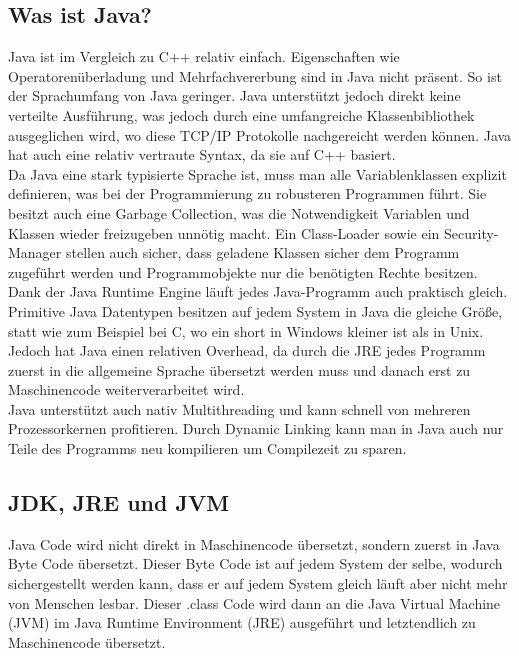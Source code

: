 \documentclass{article}
\begin{document}
	\subsection{Was ist Java?}
	Java ist im Vergleich zu C++ relativ einfach. Eigenschaften wie Operatorenüberladung und Mehrfachvererbung sind in Java nicht präsent. So ist der Sprachumfang von Java geringer. Java unterstützt jedoch direkt keine verteilte Ausführung, was jedoch durch eine umfangreiche Klassenbibliothek ausgeglichen wird, wo diese TCP/IP Protokolle nachgereicht werden können. Java hat auch eine relativ vertraute Syntax, da sie auf C++ basiert. \\
	Da Java eine stark typisierte Sprache ist, muss man alle Variablenklassen explizit definieren, was bei der Programmierung zu robusteren Programmen führt. Sie besitzt auch eine Garbage Collection, was die Notwendigkeit Variablen und Klassen wieder freizugeben unnötig macht. Ein Class-Loader sowie ein Security-Manager stellen auch sicher, dass geladene Klassen sicher dem Programm zugeführt werden und Programmobjekte nur die benötigten Rechte besitzen. Dank der Java Runtime Engine läuft jedes Java-Programm auch praktisch gleich.\\
	Primitive Java Datentypen besitzen auf jedem System in Java die gleiche Größe, statt wie zum Beispiel bei C, wo ein short in Windows kleiner ist als in Unix. \\
	Jedoch hat Java einen relativen Overhead, da durch die JRE jedes Programm zuerst in die allgemeine Sprache übersetzt werden muss und danach erst zu Maschinencode weiterverarbeitet wird. \\
	Java unterstützt auch nativ Multithreading und kann schnell von mehreren Prozessorkernen profitieren. Durch Dynamic Linking kann man in Java auch nur Teile des Programms neu kompilieren um Compilezeit zu sparen. \\
	\subsection{JDK, JRE und JVM}
	Java Code wird nicht direkt in Maschinencode übersetzt, sondern zuerst in Java Byte Code übersetzt. Dieser Byte Code ist auf jedem System der selbe, wodurch sichergestellt werden kann, dass er auf jedem System gleich läuft aber nicht mehr von Menschen lesbar. Dieser .class Code wird dann an die Java Virtual Machine (JVM) im Java Runtime Environment (JRE) ausgeführt und letztendlich zu Maschinencode übersetzt. \\
\end{document}
